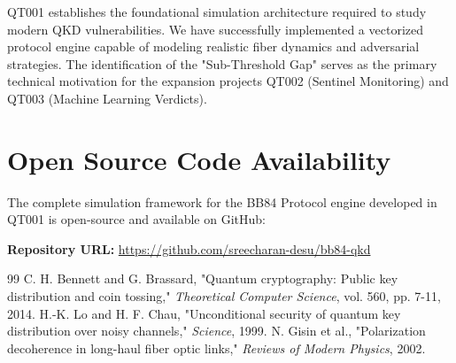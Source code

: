\documentclass[journal,onecolumn,12pt,draftclsnofoot]{IEEEtran}
\begin{document}
QT001 establishes the foundational simulation architecture required to study modern QKD vulnerabilities. We have successfully implemented a vectorized protocol engine capable of modeling realistic fiber dynamics and adversarial strategies. The identification of the "Sub-Threshold Gap" serves as the primary technical motivation for the expansion projects QT002 (Sentinel Monitoring) and QT003 (Machine Learning Verdicts).

\section*{Open Source Code Availability}
The complete simulation framework for the BB84 Protocol engine developed in QT001 is open-source and available on GitHub:
\begin{center}
    \textbf{Repository URL:} \href{https://github.com/sreecharan-desu/bb84-qkd}{https://github.com/sreecharan-desu/bb84-qkd}
\end{center}

\begin{thebibliography}{99}
 C. H. Bennett and G. Brassard, "Quantum cryptography: Public key distribution and coin tossing," \emph{Theoretical Computer Science}, vol. 560, pp. 7-11, 2014.
 H.-K. Lo and H. F. Chau, "Unconditional security of quantum key distribution over noisy channels," \emph{Science}, 1999.
 N. Gisin et al., "Polarization decoherence in long-haul fiber optic links," \emph{Reviews of Modern Physics}, 2002.
\end{thebibliography}
\end{document}
